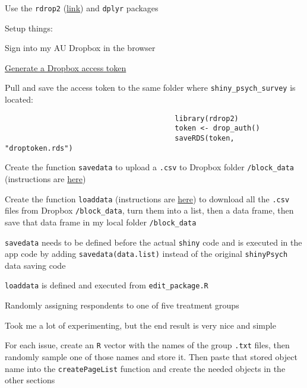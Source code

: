 \documentclass[12pt]{article}
\begin{document}
\begin{coi}
\begin{coi}
\begin{coi}
						\item Use the {\tt rdrop2} (\href{https://github.com/karthik/rdrop2}{link}) and {\tt dplyr} packages
						\item Setup things:
							\begin{coi}
								\item Sign into my AU Dropbox in the browser
								\item \href{https://blogs.dropbox.com/developers/2014/05/generate-an-access-token-for-your-own-account/}{Generate a Dropbox access token}
								\item Pull and save the access token to the same folder where {\tt shiny\_psych\_survey} is located:
									\begin{verbatim}
										library(rdrop2)
										token <- drop_auth()
										saveRDS(token, "droptoken.rds")
									\end{verbatim}
							\end{coi}
						\item Create the function {\tt savedata} to upload a {\tt .csv} to Dropbox folder {\tt /block\_data} (instructions are \href{http://shiny.rstudio.com/articles/persistent-data-storage.html#dropbox}{here})
						\item Create the function {\tt loaddata} (instructions are \href{http://shiny.rstudio.com/articles/persistent-data-storage.html#dropbox}{here}) to download all the {\tt .csv} files from Dropbox {\tt /block\_data}, turn them into a list, then a data frame, then save that data frame in my local folder {\tt /block\_data}
						\item {\tt savedata} needs to be defined before the actual {\tt shiny} code and is executed in the app code by adding {\tt  savedata(data.list)} instead of the original {\tt shinyPsych} data saving code
						\item {\tt loaddata} is defined and executed from {\tt edit\_package.R}
					\end{coi}
			\end{coi}
		\item Randomly assigning respondents to one of five treatment groups
			\begin{coi}
				\item Took me a lot of experimenting, but the end result is very nice and simple
				\item For each issue, create an {\tt R} vector with the names of the group {\tt .txt} files, then randomly sample one of those names and store it. Then paste that stored object name into the {\tt createPageList} function and create the needed objects in the other sections

\end{coi}
\end{coi}
\end{document}
